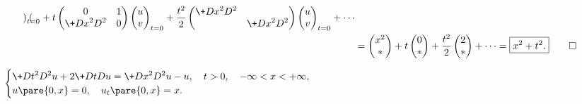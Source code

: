 \documentclass[hidelinks]{ctexart}
\begin{document}
\begin{solution}
\begin{align*}
\begin{pmatrix}
        \end{pmatrix}_{t=0} + t\begin{pmatrix}
            0 & 1 \\
            \displaystyle \+D{x^2}D{^2} & 0
        \end{pmatrix}\begin{pmatrix}
            u \\ v
        \end{pmatrix}_{t=0} + \frac{t^2}{2}\begin{pmatrix}
            \displaystyle \+D{x^2}D{^2} & \\
            & \displaystyle \+D{x^2}D{^2}
        \end{pmatrix}\begin{pmatrix}
            u \\ v
        \end{pmatrix}_{t=0} + \cdots \\
        &= \begin{pmatrix}
            x^2 \\ *
        \end{pmatrix} + t\begin{pmatrix}
            0 \\ *
        \end{pmatrix} + \frac{t^2}{2} \begin{pmatrix}
            2 \\ *
        \end{pmatrix} + \cdots = \boxed{x^2 + t^2.} \qedhere
    \end{align*}
\end{solution}
\begin{ex}
    $\displaystyle \begin{cases}
        \displaystyle \+D{t^2}D{^2u} + 2\+DtDu = \+D{x^2}D{^2u} - u, \quad t>0,\quad -\infty<x<+\infty, \\
        u\pare{0,x} = 0,\quad u_t\pare{0,x} = x.
    \end{cases}$
\end{ex}
\end{document}
